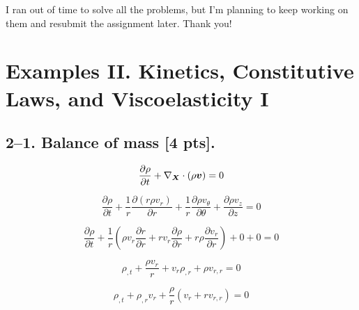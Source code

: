 \documentclass[preprint,12pt,authoryear]{elsarticle}
\begin{document}
I ran out of time to solve all the problems, but I'm planning to keep working on them and resubmit the assignment later. Thank you!

\newpage


\section*{Examples II. Kinetics, Constitutive Laws, and Viscoelasticity I}

\subsection*{2--1. \textbf{Balance of mass} [4 pts].}

\begin{equation*}
    \frac{\partial \rho}{\partial t} + \nabla_{\bm{X}} \cdot (\rho \bm{v}) = 0
\end{equation*}

\begin{equation*}
    \frac{\partial \rho}{\partial t} + \frac{1}{r} \frac{\partial (r \rho v_r)}{\partial r} + \frac{1}{r} \frac{\partial \rho v_\theta}{\partial \theta} + \frac{\partial \rho v_z}{\partial z} = 0
\end{equation*}

\begin{equation*}
    \frac{\partial \rho}{\partial t} + \frac1r (\rho v_r \frac{\partial r}{\partial r}+ rv_r \frac{\partial \rho}{\partial r} + r \rho \frac{\partial v_r}{\partial r}) + 0 + 0 = 0
\end{equation*}

\begin{equation*}
    \rho_{,t} + \frac{\rho v_r}{r} + v_r \rho_{,r} + \rho v_{r,r} = 0
\end{equation*}

\begin{equation*}
    \rho_{,t} + \rho_{,r} v_r + \frac{\rho}{r}(v_r + r v_{r,r}) = 0
\end{equation*}
\end{document}
